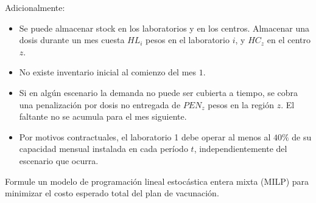 \documentclass[11pt, a4paper]{article}
\begin{document}
  Adicionalmente:
  \begin{itemize}
    \item Se puede almacenar stock en los laboratorios y en los centros. Almacenar una dosis durante un mes cuesta $HL_i$ pesos en el laboratorio $i$, y $HC_z$ en el centro $z$.
    \item No existe inventario inicial al comienzo del mes $1$.
    \item Si en algún escenario la demanda no puede ser cubierta a tiempo, se cobra una penalización por dosis no entregada de $PEN_z$ pesos en la región $z$. El faltante no se acumula para el mes siguiente.
    \item Por motivos contractuales, el laboratorio 1 debe operar al menos al $40\%$ de su capacidad mensual instalada en cada período $t$, independientemente del escenario que ocurra.
  \end{itemize}

  Formule un modelo de programación lineal estocástica entera mixta (MILP) para minimizar el costo esperado total del plan de vacunación.
\end{document}
